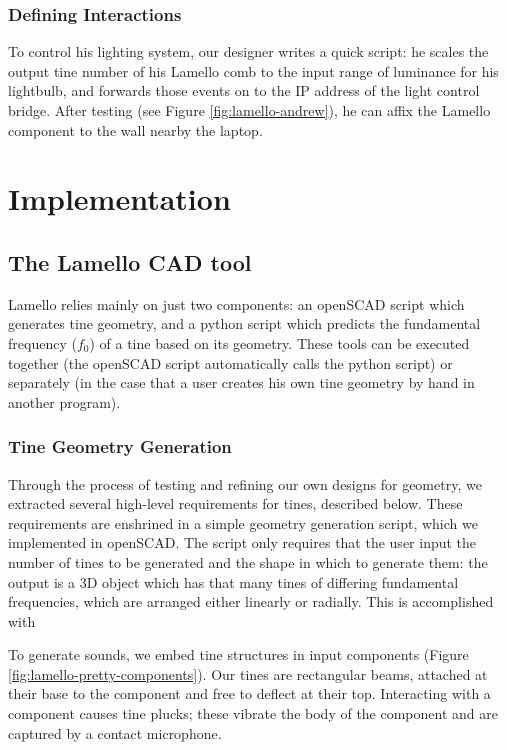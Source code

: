     \subsubsection{Defining Interactions}
    
    To control his lighting system, our designer writes a quick script: he scales the output tine number of his Lamello comb to the input range of luminance for his lightbulb, and forwards those events on to the IP address of the light control bridge. After testing (see Figure \ref{fig:lamello-andrew}), he can affix the Lamello component to the wall nearby the laptop.
    
\section{Implementation}

    \subsection{The Lamello CAD tool}
    
    Lamello relies mainly on just two components: an openSCAD script which generates tine geometry, and a python script which predicts the fundamental frequency ($f_0$) of a tine based on its geometry. These tools can be executed together (the openSCAD script automatically calls the python script) or separately (in the case that a user creates his own tine geometry by hand in another program).
    
        \subsubsection{Tine Geometry Generation}
    
        Through the process of testing and refining our own designs for geometry, we extracted several high-level requirements for tines, described below. These requirements are enshrined in a simple geometry generation script, which we implemented in openSCAD. The script only requires that the user input the number of tines to be generated and the shape in which to generate them: the output is a 3D object which has that many tines of differing fundamental frequencies, which are arranged either linearly or radially. This is accomplished with 

        To generate sounds, we embed tine structures in input components (Figure \ref{fig:lamello-pretty-components}). Our tines are rectangular beams, attached at their base to the component and free to deflect at their top. Interacting with a component causes tine plucks; these vibrate the body of the component and are captured by a contact microphone.
        
